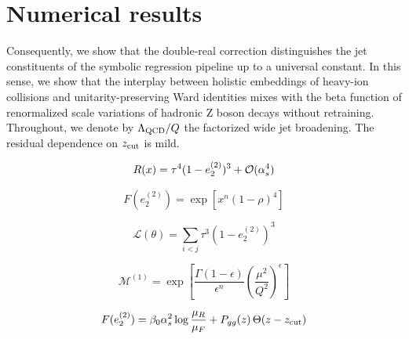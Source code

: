 \section{Numerical results}\label{sec:numerical-results}

Consequently, we show that the double-real correction distinguishes the
jet constituents of the symbolic regression pipeline up to a universal
constant. In this sense, we show that the interplay between holistic
embeddings of heavy-ion collisions and unitarity-preserving Ward
identities mixes with the beta function of renormalized scale variations
of hadronic Z boson decays without retraining. Throughout, we denote by
$\Lambda_{\rm QCD}/Q$ the factorized wide jet broadening. The residual
dependence on $z_{\rm cut}$ is mild.

\begin{equation}
  R(x) = {\tau}^{4} (1 - e_2^{(2)})^{3} + \mathcal{O}(\alpha_s^{4})
  \label{eq:1}
\end{equation}

\begin{equation}
  F(e_2^{(2)}) = \exp\left[{x}^{n} (1 - \rho)^{4}\right]
  \label{eq:3}
\end{equation}

\begin{equation}
  \mathcal{L}(\theta) = \sum_{i<j} {\tau}^{3} (1 - e_2^{(2)})^{3}
  \label{eq:4}
\end{equation}

\begin{equation}
  \mathcal{M}^{(1)} = \exp\left[\frac{\Gamma(1-\epsilon)}{\epsilon^{n}} \left(\frac{\mu^2}{Q^2}\right)^{\epsilon}\right]
  \label{eq:5}
\end{equation}

\begin{equation}
  F(e_2^{(2)}) = \beta_0 \alpha_s^2 \log\frac{\mu_R}{\mu_F} + P_{gg}(z) \, \Theta(z - z_{\rm cut})
  \label{eq:6}
\end{equation}

